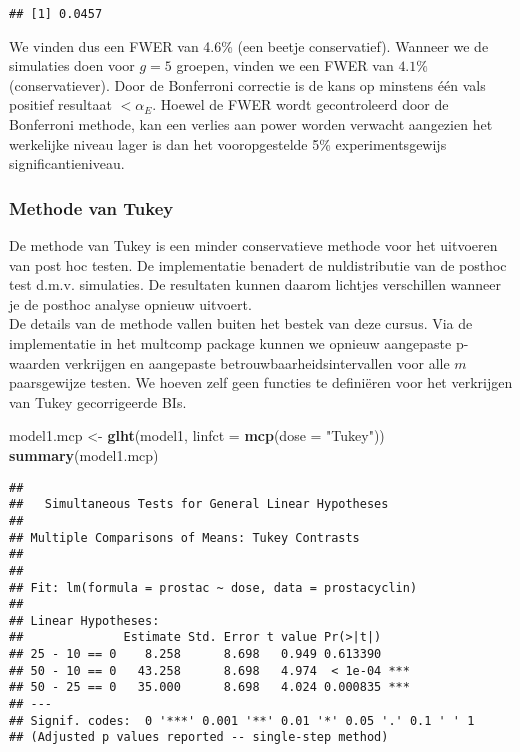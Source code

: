 \documentclass[12pt,dutch,coursenotes]{book}
\newenvironment{Shaded}{\begin{snugshade}}{\end{snugshade}}
\newcommand{\KeywordTok}[1]{\textcolor[rgb]{0.13,0.29,0.53}{\textbf{#1}}}
\newcommand{\DataTypeTok}[1]{\textcolor[rgb]{0.13,0.29,0.53}{#1}}
\newcommand{\StringTok}[1]{\textcolor[rgb]{0.31,0.60,0.02}{#1}}
\newcommand{\NormalTok}[1]{#1}
\theoremstyle{definition}
\theoremstyle{definition}
\theoremstyle{definition}
\theoremstyle{remark}
\begin{document}
\begin{verbatim}
## [1] 0.0457
\end{verbatim}

We vinden dus een FWER van 4.6\% (een beetje conservatief). Wanneer we
de simulaties doen voor \(g=5\) groepen, vinden we een FWER van
\(4.1\%\) (conservatiever). Door de Bonferroni correctie is de kans op
minstens één vals positief resultaat \(< \alpha_E\). Hoewel de FWER
wordt gecontroleerd door de Bonferroni methode, kan een verlies aan
power worden verwacht aangezien het werkelijke niveau lager is dan het
vooropgestelde 5\% experimentsgewijs significantieniveau.

\subsubsection{Methode van Tukey}\label{methode-van-tukey}

De methode van Tukey is een minder conservatieve methode voor het
uitvoeren van post hoc testen. De implementatie benadert de
nuldistributie van de posthoc test d.m.v. simulaties. De resultaten
kunnen daarom lichtjes verschillen wanneer je de posthoc analyse opnieuw
uitvoert.\\
De details van de methode vallen buiten het bestek van deze cursus. Via
de implementatie in het multcomp package kunnen we opnieuw aangepaste
p-waarden verkrijgen en aangepaste betrouwbaarheidsintervallen voor alle
\(m\) paarsgewijze testen. We hoeven zelf geen functies te definiëren
voor het verkrijgen van Tukey gecorrigeerde BIs.

\begin{Shaded}
\begin{Highlighting}[]
\NormalTok{model1.mcp <-}\StringTok{ }\KeywordTok{glht}\NormalTok{(model1, }\DataTypeTok{linfct =} \KeywordTok{mcp}\NormalTok{(}\DataTypeTok{dose =} \StringTok{"Tukey"}\NormalTok{))}
\KeywordTok{summary}\NormalTok{(model1.mcp)}
\end{Highlighting}
\end{Shaded}

\begin{verbatim}
## 
##   Simultaneous Tests for General Linear Hypotheses
## 
## Multiple Comparisons of Means: Tukey Contrasts
## 
## 
## Fit: lm(formula = prostac ~ dose, data = prostacyclin)
## 
## Linear Hypotheses:
##              Estimate Std. Error t value Pr(>|t|)    
## 25 - 10 == 0    8.258      8.698   0.949 0.613390    
## 50 - 10 == 0   43.258      8.698   4.974  < 1e-04 ***
## 50 - 25 == 0   35.000      8.698   4.024 0.000835 ***
## ---
## Signif. codes:  0 '***' 0.001 '**' 0.01 '*' 0.05 '.' 0.1 ' ' 1
## (Adjusted p values reported -- single-step method)
\end{verbatim}
\end{document}

